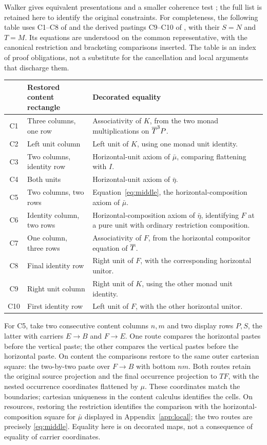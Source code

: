 \documentclass[11pt]{article}
\numberwithin{equation}{section}
\theoremstyle{definition}\newtheorem{definition}[theorem]{Definition}
\begin{document}
Walker gives equivalent presentations and a smaller coherence test
\cite[Thm.~5.0.1 and Sec.~5.3]{walker}; the full list is retained here
to identify the original constraints. For completeness, the following
table uses C1--C8 of \cite[Def.~4.1]{GL} and the derived pastings
C9--C10 of \cite[App.~A]{GL}, with their $S=N$ and $T=M$.
Its equations are understood on the common representative, with the
canonical restriction and bracketing comparisons inserted. The table is
an index of proof obligations, not a substitute for the cancellation and
local arguments that discharge them.
\begin{center}\small
\begin{tabular}{@{}cp{.27\linewidth}p{.59\linewidth}@{}}
\toprule
&Restored content rectangle&Decorated equality\\\midrule
C1&Three columns, one row&Associativity of $K$, from the two monad multiplications on $\overline T^3P$.\\[3pt]
C2&Left unit column&Left unit of $K$, using one monad unit identity.\\[3pt]
C3&Two columns, identity row&Horizontal-unit axiom of $\bar\mu$, comparing flattening with $I$.\\[3pt]
C4&Both units&Horizontal-unit axiom of $\bar\eta$.\\[3pt]
C5&Two columns, two rows&Equation~\eqref{eq:middle}, the horizontal-composition axiom of $\bar\mu$.\\[3pt]
C6&Identity column, two rows&Horizontal-composition axiom of $\bar\eta$, identifying $F$ at a pure unit with ordinary restriction composition.\\[3pt]
C7&One column, three rows&Associativity of $F$, from the horizontal compositor equation of $\overline T$.\\[3pt]
C8&Final identity row&Right unit of $F$, with the corresponding horizontal unitor.\\[3pt]
C9&Right unit column&Right unit of $K$, using the other monad unit identity.\\[3pt]
C10&First identity row&Left unit of $F$, with the other horizontal unitor.\\\bottomrule
\end{tabular}
\end{center}
For C5, take two consecutive content columns $n,m$ and two display
rows $P,S$, the latter with carriers $E\to B$ and $F\to E$. One route compares the horizontal pastes before the vertical paste;
the other compares the vertical pastes before the horizontal paste. On content the comparisons restore to the
same outer cartesian square: the two-by-two paste over $F\to B$ with
bottom $nm$. Both routes retain the original source projection and the
final occurrence projection to $TF$, with the nested occurrence
coordinates flattened by $\mu$. These coordinates match the boundaries;
cartesian uniqueness in the content calculus identifies the cells.
On resources, restoring the restriction identifies the comparison with
the horizontal-composition square for $\bar\mu$ displayed in
Appendix~\ref{app:local}; the two routes are precisely
\eqref{eq:middle}. Equality here is on decorated maps, not a consequence
of equality of carrier coordinates.
\end{document}

